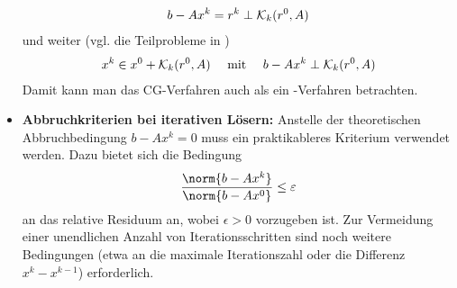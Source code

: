 \begin{itemize}
	\begin{align}
		b-Ax^k = r^k\perp \mathcal{K}_k(r^0,A)\notag
	\end{align}
	und weiter (vgl. die Teilprobleme in )
	\begin{align}
		x^k\in x^0+\mathcal{K}_k(r^0,A)\quad\mit\quad b-Ax^k\perp \mathcal{K}_k(r^0,A)\notag
	\end{align}
	Damit kann man das CG-Verfahren auch als ein -Verfahren betrachten.
	\item \textbf{Abbruchkriterien bei iterativen Lösern:} Anstelle der theoretischen Abbruchbedingung $b-Ax^k=0$ muss ein praktikableres Kriterium verwendet werden. Dazu bietet sich die Bedingung
	\begin{align}
		\frac{\norm{b-Ax^k}}{\norm{b-Ax^0}} \le \epsilon\notag
	\end{align}
	an das relative Residuum an, wobei $\epsilon>0$ vorzugeben ist. Zur Vermeidung einer unendlichen Anzahl von Iterationsschritten sind noch weitere Bedingungen (etwa an die maximale Iterationszahl oder die Differenz $x^k-x^{k-1}$) erforderlich.
\end{itemize}